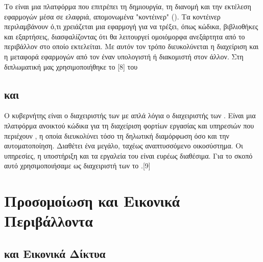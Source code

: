 Το  είναι μια πλατφόρμα που επιτρέπει τη δημιουργία, τη διανομή και την εκτέλεση εφαρμογών μέσα σε ελαφριά, απομονωμένα "κοντέινερ" (). 
Τα κοντέινερ περιλαμβάνουν ό,τι χρειάζεται μια εφαρμογή για να τρέξει, όπως κώδικα, βιβλιοθήκες και εξαρτήσεις, διασφαλίζοντας ότι θα λειτουργεί ομοιόμορφα 
ανεξάρτητα από το περιβάλλον στο οποίο εκτελείται. Με αυτόν τον τρόπο διευκολύνεται η διαχείριση και η μεταφορά εφαρμογών από τον έναν υπολογιστή ή διακομιστή 
στον άλλον. Στη διπλωματική μας χρησιμοποιήθηκε το [8] του 

\subsection{ και }

Ο κυβερνήτης είναι ο διαχειριστής των με απλά λόγια ο διαχειριστής των . Είναι μια 
πλατφόρμα ανοικτού κώδικα για τη διαχείριση φορτίων εργασίας και υπηρεσιών που περιέχουν 
, η οποία διευκολύνει τόσο τη δηλωτική διαμόρφωση όσο και την αυτοματοποίηση. 
Διαθέτει ένα μεγάλο, ταχέως αναπτυσσόμενο οικοσύστημα. Οι υπηρεσίες, η υποστήριξη και τα εργαλεία του  είναι ευρέως διαθέσιμα. Για το σκοπό αυτό χρησιμοποιήσαμε ως διαχειριστή των  το .[9]






\section{Προσομοίωση και Εικονικά Περιβάλλοντα}

\subsection{ και Εικονικά Δίκτυα}

